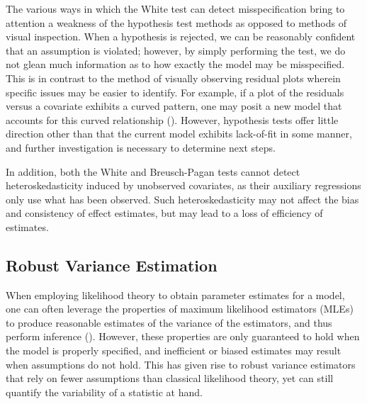 \documentclass[12pt]{article} %
\theoremstyle{definition}
\begin{document}
		The various ways in which the White test can detect misspecification bring to attention a weakness of the hypothesis test methods as opposed to methods of visual inspection.
		When a hypothesis is rejected, we can be reasonably confident that an assumption is violated; however, by simply performing the test, we do not glean much information as to how exactly the
		model may be misspecified. This is in contrast to the method of visually observing residual plots wherein specific issues may be easier to identify.
		For example, if a plot of the residuals versus a covariate exhibits a curved pattern, one may posit a new model that accounts for this curved relationship (\cite{Miles}).
		However, hypothesis tests offer little direction other than that the current model exhibits lack-of-fit in some manner, and further investigation is necessary to determine next steps.

		In addition, both the White and Breusch-Pagan tests cannot detect heteroskedasticity induced by unobserved covariates, as their auxiliary regressions only use what has been observed. Such heteroskedasticity
		may not affect the bias and consistency of effect estimates, but may lead to a loss of efficiency of estimates. 

		\subsection*{Robust Variance Estimation}
	
		When employing likelihood theory to obtain parameter estimates for a model, one can often leverage the properties of maximum likelihood estimators (MLEs) to produce reasonable estimates of the variance of the
		estimators, and thus perform inference (\cite{Millar}). However, these properties are only guaranteed to hold when the model is properly specified, and inefficient or biased estimates may result when assumptions
		do not hold. This has given rise to robust variance estimators that rely on fewer assumptions than classical likelihood theory, yet can still quantify the variability of a statistic
		at hand.
\end{document}
